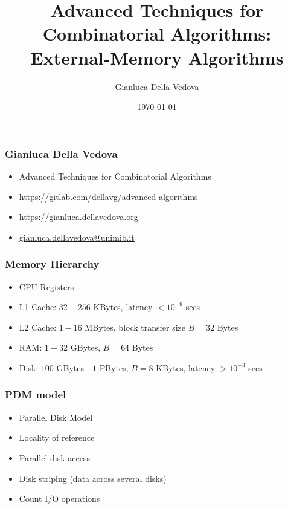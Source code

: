 \documentclass[12pt,aspectratio=169]{beamer}
\author{Gianluca Della Vedova}
\title[Advanced Algorithms]{Advanced Techniques for Combinatorial Algorithms:
External-Memory Algorithms}
\institute[]{Univ. Milano--Bicocca\\
  \texttt{https://gianluca.dellavedova.org}}
\date[]{{\tiny \today\hspace{1em} \vcsShortHash}}
\begin{document}
\begin{frame}
  \titlepage
\end{frame}


\begin{frame}\frametitle{Gianluca Della Vedova}
  \begin{itemize}
  \item
                Advanced Techniques for Combinatorial Algorithms
\item
{\small\url{https://gitlab.com/dellavg/advanced-algorithms}}
  \item
{\small\url{https://gianluca.dellavedova.org}}
  \item
{\small\url{gianluca.dellavedova@unimib.it}}
  \end{itemize}
\end{frame}



\begin{frame}\frametitle{Memory Hierarchy}
  \begin{itemize}
  \item
    CPU Registers
  \item
    L1 Cache: $32-256$ KBytes, latency $< 10^{-9}$ secs
  \item
    L2 Cache: $1-16$ MBytes, block transfer size $B=32$ Bytes
  \item
    RAM: $1-32$ GBytes,  $B=64$ Bytes
  \item
    Disk: $100$ GBytes - $1$ PBytes,  $B=8$ KBytes, latency $> 10^{-3}$ secs
  \end{itemize}
\end{frame}


\begin{frame}\frametitle{PDM model}
  \begin{itemize}
  \item
    Parallel Disk Model
  \item
    Locality of reference
  \item
    Parallel disk access
  \item
    Disk striping (data across several disks)
  \item
    Count \alert{I/O operations}
  \end{itemize}
\end{frame}
\end{document}
